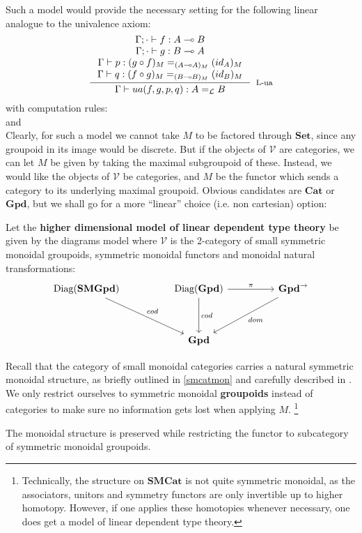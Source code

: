 Such a model would provide the necessary setting for the following linear analogue to the univalence axiom:
\[
  \inference{\Gamma; \cdot \vdash f : A \multimap B\\
    \Gamma; \cdot \vdash g : B \multimap A\\
    \Gamma \vdash p : (g \circ f)_M  =_{(A \multimap A)_M} (id_A)_M\\
    \Gamma \vdash q : (f \circ g)_M =_{(B \multimap B)_M} (id_B)_M\\
    }{\Gamma \vdash ua(f, g, p, q) : A =_{\mathcal{L}} B}[L-ua]
  \]
  with computation rules:
  \[
  \]
  and
  \[
  \]
  Clearly, for such a model we cannot take $M$ to be factored through $\mathbf{Set}$, since any groupoid in its image would be discrete. But if the objects of $\mathcal{V}$ are categories, we can let $M$ be given by taking the maximal subgroupoid of these. Instead, we would like the objects of $\mathcal{V}$ be categories, and $M$ be the functor which sends a category to its underlying maximal groupoid. Obvious candidates are $\mathbf{Cat}$ or $\mathbf{Gpd}$, but we shall go for a more ``linear'' choice (i.e. non cartesian) option:
\begin{defn}
 Let the \textbf{higher dimensional model of linear dependent type theory} be given by the diagrams model where $\mathcal{V}$ is the 2-category of small symmetric monoidal groupoids, symmetric monoidal functors and monoidal natural transformations:
  \[
    \ti
    \diag(\mathbf{SMGpd}) \ar[rd, "cod"] & \diag(\mathbf{Gpd}) \ar[r, "\pi"] \ar[d, "cod"] & \mathbf{Gpd}^\to \ar[ld, "dom"]\\
    & \mathbf{Gpd}
    \kz
  \]
\end{defn}
Recall that the category of small monoidal categories carries a natural symmetric monoidal structure, as briefly outlined in \ref{smcatmon} and carefully described in \cite{smcat}. 
We only restrict ourselves to symmetric monoidal \textbf{groupoids} instead of categories to make sure no information gets lost when applying $M$.
\footnote{Technically, the structure on $\mathbf{SMCat}$ is not quite symmetric monoidal, as the associators, unitors and symmetry functors are only invertible up to higher homotopy. However, if one applies these homotopies whenever necessary, one does get a model of linear dependent type theory.}

The monoidal structure is preserved while restricting the functor to subcategory of symmetric monoidal groupoids.

